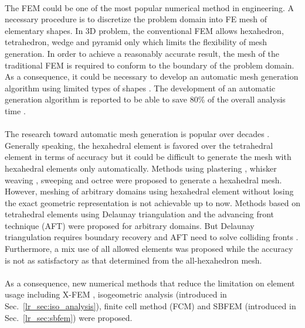 \paragraph{}
The FEM could be one of the most popular numerical method in engineering.
A necessary procedure is to discretize the problem domain into FE mesh of elementary shapes.
In 3D problem, the conventional FEM allows hexahedron, tetrahedron, wedge and pyramid only which limits the flexibility of mesh generation.
In order to achieve a reasonably accurate result, the mesh of the traditional FEM is required to conform to the boundary of the problem domain.
As a consequence, it could be necessary to develop an automatic mesh generation algorithm using limited types of shapes \citep{Frey:2007:MGA:1205626}.
The development of an automatic generation algorithm is reported to be able to save 80\% of the overall analysis time \citep{Hug2005}.

\paragraph{}
The research toward automatic mesh generation is popular over decades \citep{owen2000,Blacker1993,doi:10.1002/fld.1650081003,doi:10.1093/comjnl/24.2.167}.
Generally speaking, the hexahedral element is favored over the tetrahedral element in terms of accuracy but it could be difficult to generate the mesh with hexahedral elements only automatically.
Methods using plastering \citep{Blacker1993}, whisker weaving \citep{Tau1984}, sweeping \citep{Staten1999} and octree \citep{doi:10.1002/nme.1620201103} were proposed to generate a hexahedral mesh.
However, meshing of arbitrary domains using hexahedral element without losing the exact geometric representation is not achievable up to now.
Methods based on tetrahedral elements using Delaunay triangulation \citep{doi:10.1093/comjnl/24.2.167} and the advancing front technique (AFT) \citep{doi:10.1002/fld.1650081003} were proposed for arbitrary domains.
But Delaunay triangulation requires boundary recovery \citep{doi:10.1002/nme.808,LIU201432} and AFT need to solve colliding fronts \citep{Shewchuk1997}.
Furthermore, a mix use of all allowed elements \citep{owen2000} was proposed while the accuracy is not as satisfactory as that determined from the all-hexahedron mesh.

\paragraph{}
As a consequence, new numerical methods that reduce the limitation on element usage including X-FEM \citep{Moes1999}, isogeometric analysis \citep{Hug2005} (introduced in Sec.~\ref{lr_sec:iso_analysis}), finite cell method (FCM) \citep{Parvizian2007} and SBFEM \citep{Wol2003} (introduced in Sec.~\ref{lr_sec:sbfem}) were proposed.

